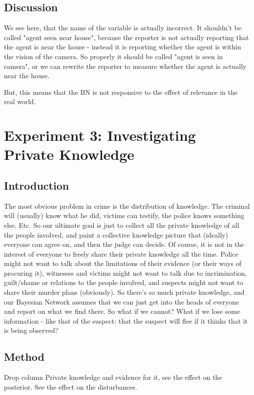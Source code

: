 \subsection{Discussion}
We see here, that the name of the variable is actually incorrect. It shouldn't be called "agent seen near house", because the reporter is not actually reporting that the agent is near the house - instead it is reporting whether the agent is within the vision of the camera. So properly it should be called "agent is seen in camera", or we can rewrite the reporter to measure whether the agent is actually near the house. 

But, this means that the BN is not responsive to the effect of relevance in the real world. 


\section{Experiment 3: Investigating Private Knowledge}

\subsection{Introduction}
The most obvious problem in crime is the distribution of knowledge. The criminal will (usually) know what he did, victims can testify, the police knows something else. Etc. So our ultimate goal is just to collect all the private knowledge of all the people involved, and paint a collective knowledge picture that (ideally) everyone can agree on, and then the judge can decide. Of course, it is not in the interest of everyone to freely share their private knowledge all the time. Police might not want to talk about the limitations of their evidence (or their ways of procuring it), witnesses and victims might not want to talk due to incrimination, guilt/shame or relations to the people involved, and suspects might not want to share their murder plans (obviously). So there's so much private knowledge, and our Bayesian Network assumes that we can just get into the heads of everyone and report on what we find there. So what if we cannot? What if we lose some information - like that of the suspect: that the suspect will flee if it thinks that it is being observed?

\subsection{Method}
Drop column Private knowledge and evidence for it, see the effect on the posterior. See the effect on the disturbances.



